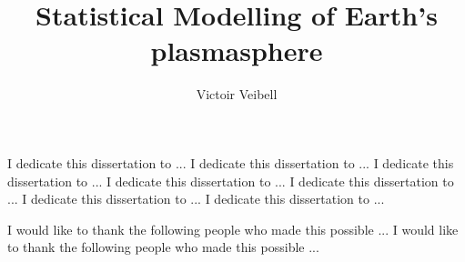 \documentclass[11 pt]{report}
\begin{document}
\title{Statistical Modelling of Earth's plasmasphere}
\author{Victoir Veibell}












\signaturepage

\titlepage

\copyrightpage


\dedicationpage

\noindent I dedicate this dissertation to ...
I dedicate this dissertation to ...
I dedicate this dissertation to ...
I dedicate this dissertation to ...
I dedicate this dissertation to ...
I dedicate this dissertation to ...
I dedicate this dissertation to ...


\acknowledgementspage

\noindent I would like to thank the following people who made this possible ...
I would like to thank the following people who made this possible ...
\end{document}
